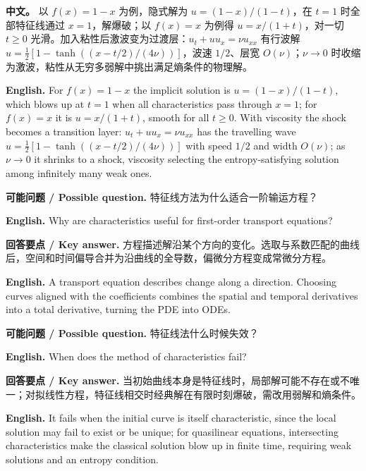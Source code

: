 \documentclass[UTF8,11pt,a4paper]{ctexart}
\newcommand{\EN}[1]{\par\noindent \textbf{English.} #1\par}
\newcommand{\ASK}[4]{\par\noindent \textbf{可能问题 / Possible question.} #1\par\EN{#2}\noindent \textbf{回答要点 / Key answer.} #3\par\EN{#4}\medskip}
\newcommand{\APS}[2]{\par\noindent\textbf{中文。} #1\par\noindent\textbf{English.} #2\par\smallskip}
\begin{document}
\APS{以 $f(x)=1-x$ 为例，隐式解为 $u=(1-x)/(1-t)$，在 $t=1$ 时全部特征线通过 $x=1$，解爆破；以 $f(x)=x$ 为例得 $u=x/(1+t)$，对一切 $t\ge0$ 光滑。加入粘性后激波变为过渡层：$u_t+uu_x=\nu u_{xx}$ 有行波解 $u=\frac12[1-\tanh((x-t/2)/(4\nu))]$，波速 $1/2$、层宽 $O(\nu)$；$\nu\to0$ 时收缩为激波，粘性从无穷多弱解中挑出满足熵条件的物理解。}{For $f(x)=1-x$ the implicit solution is $u=(1-x)/(1-t)$, which blows up at $t=1$ when all characteristics pass through $x=1$; for $f(x)=x$ it is $u=x/(1+t)$, smooth for all $t\ge0$. With viscosity the shock becomes a transition layer: $u_t+uu_x=\nu u_{xx}$ has the travelling wave $u=\frac12[1-\tanh((x-t/2)/(4\nu))]$ with speed $1/2$ and width $O(\nu)$; as $\nu\to0$ it shrinks to a shock, viscosity selecting the entropy-satisfying solution among infinitely many weak ones.}
\ASK{特征线方法为什么适合一阶输运方程？}{Why are characteristics useful for first-order transport equations?}{方程描述解沿某个方向的变化。选取与系数匹配的曲线后，空间和时间偏导合并为沿曲线的全导数，偏微分方程变成常微分方程。}{A transport equation describes change along a direction. Choosing curves aligned with the coefficients combines the spatial and temporal derivatives into a total derivative, turning the PDE into ODEs.}
\ASK{特征线法什么时候失效？}{When does the method of characteristics fail?}{当初始曲线本身是特征线时，局部解可能不存在或不唯一；对拟线性方程，特征线相交时经典解在有限时刻爆破，需改用弱解和熵条件。}{It fails when the initial curve is itself characteristic, since the local solution may fail to exist or be unique; for quasilinear equations, intersecting characteristics make the classical solution blow up in finite time, requiring weak solutions and an entropy condition.}
\end{document}
